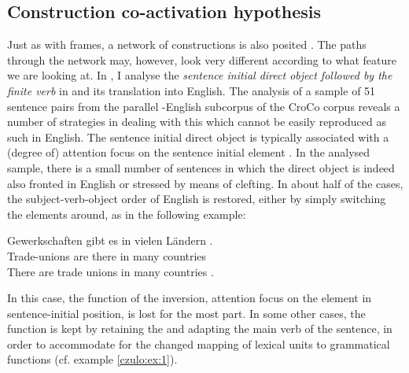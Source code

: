 \documentclass[output=paper]{LSP/langsci}
\begin{document}
\subsection{Construction co-activation hypothesis}\label{czulo:sec:4.2}

Just as with frames, a network of constructions is also posited \citep[67ff.]{Goldberg1995}. The paths through the network may, however, look very different according to what feature we are looking at. In \citet{Culo2016}, I analyse the \textit{sentence initial direct object followed by the finite verb}  in  and its translation into English. The analysis of a sample of 51 sentence pairs from the parallel -English subcorpus of the CroCo corpus \citep{HansenSchirra2012Cross} reveals a number of strategies in dealing with this   which cannot be easily reproduced as such in English. The sentence initial direct object is typically associated with a (degree of) attention focus on the sentence initial element \citep[578]{Helbig2001}. In the analysed sample, there is a small number of sentences in which the direct object is indeed also fronted in English or stressed by means of clefting. In about half of the cases, the subject-verb-object order of English is restored, either by simply switching the elements around, as in the following example:

\ea\label{czulo:ex:10}
\gll Gewerkschaften gibt es in vielen Ländern . \\
Trade{}-unions are there in many countries \\
\glt There are trade unions in many countries .
\z

In this case, the function of the inversion, attention focus on the element in sentence-initial position, is lost for the most part. In some other cases, the function is kept by retaining the  and adapting the main verb of the sentence, in order to accommodate for the changed mapping of lexical units to grammatical functions (cf. example \ref{czulo:ex:1}).
\end{document}
